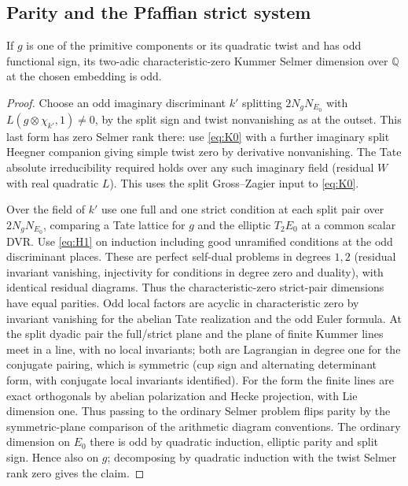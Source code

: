 \subsection{Parity and the Pfaffian strict system}

\begin{lemma}\label{real:parity}
If \(g\) is one of the primitive components or its quadratic twist and has odd functional sign, its two-adic characteristic-zero Kummer Selmer dimension over \(\mathbb Q\) at the chosen embedding is odd.
\end{lemma}

\begin{proof}
Choose an odd imaginary discriminant \(k'\) splitting \(2N_gN_{E_0}\) with \(L(g\otimes\chi_{k'},1)\ne0\), by the split sign and twist nonvanishing as at the outset. This last form has zero Selmer rank there: use \eqref{eq:K0} with a further imaginary split Heegner companion giving simple twist zero by derivative nonvanishing. The Tate absolute irreducibility required holds over any such imaginary field (residual \(W\) with real quadratic \(L\)). This uses the split Gross--Zagier input to \eqref{eq:K0}. 

Over the field of \(k'\) use one full and one strict condition at each split pair over \(2N_gN_{E_0}\), comparing a Tate lattice for \(g\) and the elliptic \(T_2E_0\) at a common scalar DVR. Use \eqref{eq:H1} on induction including good unramified conditions at the odd discriminant places. These are perfect self-dual problems in degrees \(1,2\) (residual invariant vanishing, injectivity for conditions in degree zero and duality), with identical residual diagrams. Thus the characteristic-zero strict-pair dimensions have equal parities. Odd local factors are acyclic in characteristic zero by invariant vanishing for the abelian Tate realization and the odd Euler formula. At the split dyadic pair the full/strict plane and the plane of finite Kummer lines meet in a line, with no local invariants; both are Lagrangian in degree one for the conjugate pairing, which is symmetric (cup sign and alternating determinant form, with conjugate local invariants identified). For the form the finite lines are exact orthogonals by abelian polarization and Hecke projection, with Lie dimension one. Thus passing to the ordinary Selmer problem flips parity by the symmetric-plane comparison of the arithmetic diagram conventions. The ordinary dimension on \(E_0\) there is odd by quadratic induction, elliptic parity and split sign. Hence also on \(g\); decomposing by quadratic induction with the twist Selmer rank zero gives the claim.
\end{proof}

